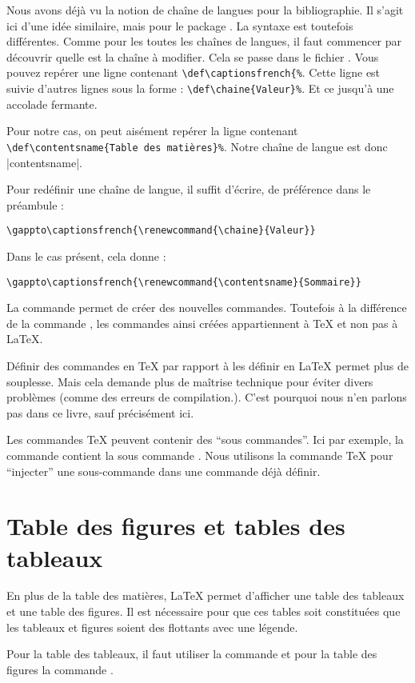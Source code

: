 Nous avons déjà vu la notion de chaîne de langues pour la bibliographie. Il s'agit ici  d'une idée similaire, mais pour le package . La syntaxe est toutefois différentes. Comme pour les toutes les chaînes de langues, il faut commencer par découvrir quelle est la chaîne à modifier. Cela se passe dans le fichier . Vous pouvez repérer une ligne contenant \verb|\def\captionsfrench{%|. 
Cette ligne est suivie d'autres lignes sous la forme : \verb|\def\chaine{Valeur}%|. Et ce jusqu'à une accolade fermante.

Pour notre cas, on peut aisément repérer la ligne contenant \verb|\def\contentsname{Table des matières}%|.
Notre chaîne de langue est donc \forme|contentsname|.

Pour  redéfinir une chaîne de langue, il suffit d'écrire, de préférence dans le préambule :

\begin{verbatim}
\gappto\captionsfrench{\renewcommand{\chaine}{Valeur}}
\end{verbatim}

Dans le cas présent, cela donne :

\begin{verbatim}
\gappto\captionsfrench{\renewcommand{\contentsname}{Sommaire}}
\end{verbatim}



\begin{anedocte}
La commande  permet de créer des nouvelles commandes. Toutefois à la différence de la commande , les commandes ainsi créées appartiennent à \TeX{} et non pas à \LaTeX{}.

Définir des commandes en \TeX{} par rapport à les définir en \LaTeX{} permet plus de souplesse. Mais cela demande plus de maîtrise technique pour éviter divers problèmes (comme des erreurs de compilation.). C'est pourquoi nous n'en parlons pas dans ce livre, sauf précisément ici.

Les commandes \TeX{} peuvent contenir des \enquote{sous commandes}. Ici par exemple, la commande  contient la sous commande . Nous utilisons la commande \TeX{}  pour \enquote{injecter} une sous-commande dans une commande déjà définir.
\end{anedocte}

\section{Table des figures et tables des tableaux}\label{tablefigure}

En plus de la table des matières, \LaTeX{} permet d'afficher une table des tableaux et une table des figures. Il est nécessaire pour que ces tables soit constituées que les tableaux et figures soient des flottants avec une légende. 

Pour la table des tableaux, il faut utiliser la commande  et pour la table des figures la commande .
